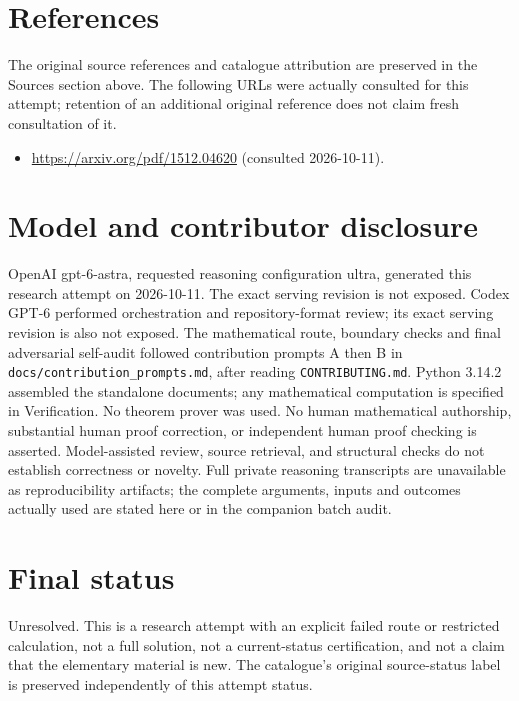 \documentclass[11pt]{article}
\begin{document}
\section{References}
The original source references and catalogue attribution are preserved in the
Sources section above. The following URLs were actually consulted for this attempt;
retention of an additional original reference does not claim fresh consultation of it.
\begin{itemize}
\item \url{https://arxiv.org/pdf/1512.04620} (consulted 2026-10-11). 
\end{itemize}
\section{Model and contributor disclosure}
OpenAI gpt-6-astra, requested reasoning configuration ultra, generated this research
attempt on 2026-10-11. The exact serving revision is not exposed. Codex GPT-6
performed orchestration and repository-format review; its exact serving revision
is also not exposed. The mathematical route, boundary checks and final adversarial
self-audit followed contribution prompts A then B in
\texttt{docs/contribution\_prompts.md}, after reading \texttt{CONTRIBUTING.md}.
Python 3.14.2 assembled the standalone documents; any mathematical computation is
specified in Verification. No theorem prover was used. No human mathematical
authorship, substantial human proof correction, or independent human proof checking
is asserted. Model-assisted review, source retrieval, and structural checks do not
establish correctness or novelty. Full private reasoning transcripts are unavailable
as reproducibility artifacts; the complete arguments, inputs and outcomes actually
used are stated here or in the companion batch audit.
\section{Final status}
Unresolved. This is a research attempt with an explicit failed route or restricted
calculation, not a full solution, not a current-status certification, and not a claim
that the elementary material is new. The catalogue's original source-status label
is preserved independently of this attempt status.
\end{document}
